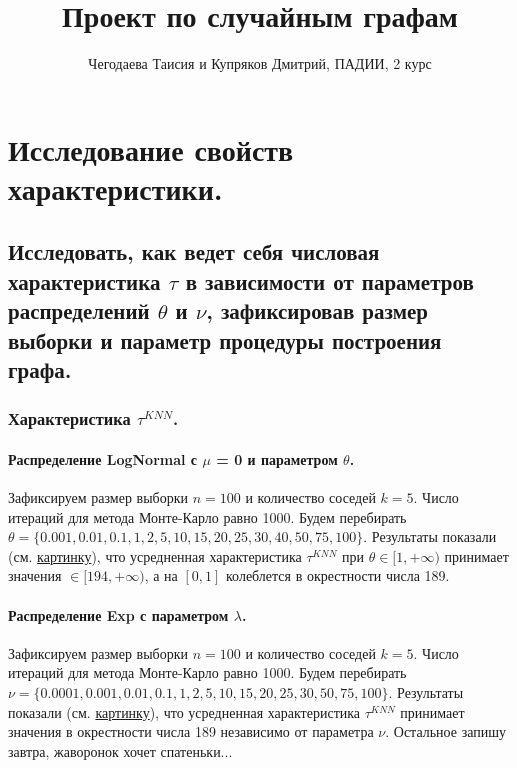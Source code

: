 \documentclass{report}
\title{Проект по случайным графам}
\author{Чегодаева Таисия и Купряков Дмитрий, ПАДИИ, 2 курс}
\begin{document}
\maketitle

\part{Исследование свойств характеристики.}
\chapter{Исследовать, как ведет себя числовая характеристика $\tau$ в зависимости от параметров распределений $\theta$ и $\nu$, зафиксировав размер выборки и параметр процедуры построения графа.}
\section{Характеристика $\tau^{KNN}$.}
\subsection{Распределение LogNormal с $\mu$ = 0 и параметром $\theta$.}
Зафиксируем размер выборки $n = 100$ и количество соседей $k = 5$. Число итераций для метода Монте-Карло равно 1000.
\newline
\newline
Будем перебирать $\theta = \{0.001, 0.01, 0.1, 1, 2, 5, 10, 15, 20, 25, 30, 40, 50, 75, 100\}$.
\newline
\newline
Результаты показали (см. \href{knn\_lognormal\_fixed\_graph\_parameters.png}{картинку}), что усредненная характеристика $\tau^{KNN}$ при $\theta \in [1, + \infty)$ принимает значения $\in [194, + \infty)$, а на $[0, 1]$ колеблется в окрестности числа 189.

\subsection{Распределение Exp с параметром $\lambda$.}
Зафиксируем размер выборки $n = 100$ и количество соседей $k = 5$. Число итераций для метода Монте-Карло равно 1000.
\newline
\newline
Будем перебирать $\nu = \{0.0001, 0.001, 0.01, 0.1, 1, 2, 5, 10, 15, 20, 25, 30, 50, 75, 100\}$.
\newline
\newline
Результаты показали (см. \href{knn\_exp\_fixed\_graph\_parameters.png}{картинку}), что усредненная характеристика $\tau^{KNN}$ принимает значения в окрестности числа 189 независимо от параметра $\nu$.
\newline
\newline
\newline
Остальное запишу завтра, жаворонок хочет спатеньки...
\end{document}
